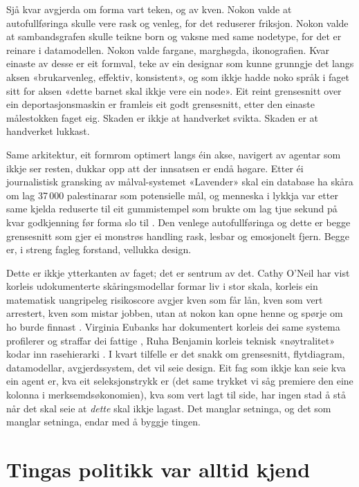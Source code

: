 Sjå kvar avgjerda om forma vart teken, og av kven. Nokon valde at autofullføringa skulle vere rask og venleg, for det reduserer friksjon. Nokon valde at sambandsgrafen skulle teikne born og vaksne med same nodetype, for det er reinare i datamodellen. Nokon valde fargane, marghøgda, ikonografien. Kvar einaste av desse er eit formval, teke av ein designar som kunne grunngje det langs aksen «brukarvenleg, effektiv, konsistent», og som ikkje hadde noko språk i faget sitt for aksen «dette barnet skal ikkje vere ein node». Eit reint grensesnitt over ein deportasjonsmaskin er framleis eit godt grensesnitt, etter den einaste målestokken faget eig. Skaden er ikkje at handverket svikta. Skaden er at handverket lukkast.

Same arkitektur, eit formrom optimert langs éin akse, navigert av agentar som ikkje ser resten, dukkar opp att der innsatsen er endå høgare. Etter éi journalistisk gransking av målval-systemet «Lavender» skal ein database ha skåra om lag 37\,000 palestinarar som potensielle mål, og menneska i lykkja var etter same kjelda reduserte til eit gummistempel som brukte om lag tjue sekund på kvar godkjenning før forma slo til \autocite{abraham2024lavender}. Den venlege autofullføringa og dette er begge grensesnitt som gjer ei monstrøs handling rask, lesbar og emosjonelt fjern. Begge er, i streng fagleg forstand, vellukka design.

Dette er ikkje ytterkanten av faget; det er sentrum av det. Cathy O'Neil har vist korleis udokumenterte skåringsmodellar formar liv i stor skala, korleis ein matematisk uangripeleg risikoscore avgjer kven som får lån, kven som vert arrestert, kven som mistar jobben, utan at nokon kan opne henne og spørje om ho burde finnast \autocite{oneil2016}. Virginia Eubanks har dokumentert korleis dei same systema profilerer og straffar dei fattige \autocite{eubanks2018}, Ruha Benjamin korleis teknisk «nøytralitet» kodar inn rasehierarki \autocite{benjamin2019}. I kvart tilfelle er det snakk om grensesnitt, flytdiagram, datamodellar, avgjerdssystem, det vil seie design. Eit fag som ikkje kan seie kva ein agent er, kva eit seleksjonstrykk er (det same trykket vi såg premiere den eine kolonna i merksemdsøkonomien), kva som vert lagt til side, har ingen stad å stå når det skal seie at \emph{dette} skal ikkje lagast. Det manglar setninga, og det som manglar setninga, endar med å byggje tingen.

\section{Tingas politikk var alltid kjend}

